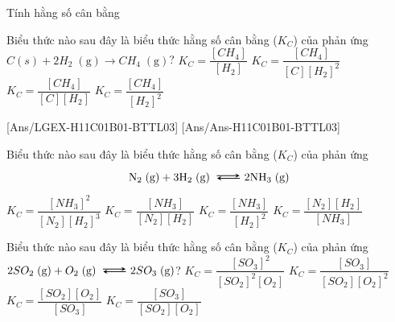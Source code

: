 \begin{dang}{Tính hằng số cân bằng}
\end{dang}
\begin{vd}
	Biểu thức nào sau đây là biểu thức hằng số cân bằng ($K_C$) của phản ứng $C(s) + 2H_2\;(\mathrm{g}) \rightarrow CH_4\;(\mathrm{g})$?
	\choice
	{$K_C = \dfrac{\left[CH_4\right]}{\left[H_2\right]}$}
	{$K_C = \dfrac{\left[CH_4\right]}{[C]\left[H_2\right]^2}$}
	{$K_C = \dfrac{\left[CH_4\right]}{[C]\left[H_2\right]}$}
	{\True $K_C = \dfrac{\left[CH_4\right]}{\left[H_2\right]^2}$}
\end{vd}
[Ans/LGEX-H11C01B01-BTTL03]
[Ans/Ans-H11C01B01-BTTL03]
\begin{ex}
	Biểu thức nào sau đây là biểu thức hằng số cân bằng ($K_C$) của phản ứng \[\mathrm{N}_2\;(\mathrm{g}) + 3\mathrm{H}_2\;(\mathrm{g}) \xleftrightarrow 2\mathrm{NH}_3\;(\mathrm{g})\]
	\choice
	{\True $K_C = \dfrac{\left[NH_3\right]^2}{\left[N_2\right]\left[H_2\right]^3}$}
	{$K_C = \dfrac{\left[NH_3\right]}{\left[N_2\right]\left[H_2\right]}$}
	{$K_C = \dfrac{\left[NH_3\right]}{\left[H_2\right]^2}$}
	{$K_C = \dfrac{\left[N_2\right]\left[H_2\right]}{\left[NH_3\right]}$}
\end{ex}
\begin{ex}
	Biểu thức nào sau đây là biểu thức hằng số cân bằng ($K_C$) của phản ứng $2SO_2\;(\mathrm{g}) + O_2\;(\mathrm{g}) \xleftrightarrow 2SO_3\;(\mathrm{g})$?
	\choice
	{\True $K_C = \dfrac{\left[SO_3\right]^2}{\left[SO_2\right]^2\left[O_2\right]}$}
	{$K_C = \dfrac{\left[SO_3\right]}{\left[SO_2\right]\left[O_2\right]^2}$}
	{$K_C = \dfrac{\left[SO_2\right]\left[O_2\right]}{\left[SO_3\right]}$}
	{$K_C = \dfrac{\left[SO_3\right]}{\left[SO_2\right]\left[O_2\right]}$}
\end{ex}
